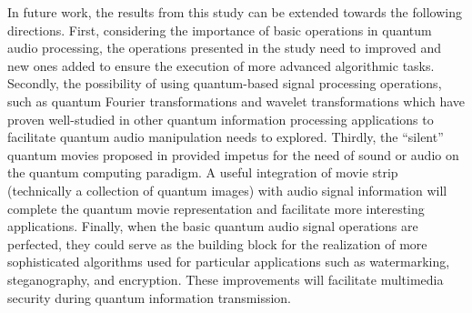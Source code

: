 \documentclass[10pt,journal,compsoc]{IEEEtran}
\begin{document}
In future work, the results from this study can be extended towards the following directions. First, considering the importance of basic operations in quantum audio processing, the operations presented in the study need to improved and new ones added to ensure the execution of more advanced algorithmic tasks. Secondly, the possibility of using quantum-based signal processing operations, such as quantum Fourier transformations \cite{14} and wavelet transformations \cite{17} which have proven well-studied in other quantum information processing applications to facilitate quantum audio manipulation needs to explored. Thirdly, the ``silent'' quantum movies proposed in \cite{18} provided impetus for the need of sound or audio on the quantum computing paradigm. A useful integration of movie strip (technically a collection of quantum images) with audio signal information will complete the quantum movie representation and facilitate more interesting applications. Finally, when the basic quantum audio signal operations are perfected, they could serve as the building block for the realization of more sophisticated algorithms used for particular applications such as watermarking, steganography, and encryption. These improvements will facilitate multimedia security during quantum information transmission.


%
\
\ifCLASSOPTIONcompsoc
\end{document}
